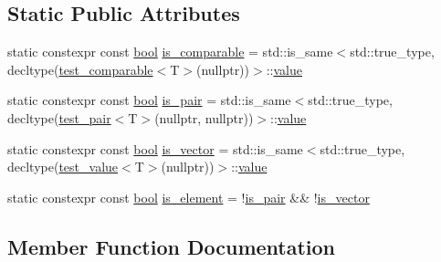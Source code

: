 \subsection*{Static Public Attributes}
\begin{DoxyCompactItemize}
\item 
static constexpr const \mbox{\hyperlink{asdl_8h_af6a258d8f3ee5206d682d799316314b1}{bool}} \mbox{\hyperlink{structcontainer__traits_ab2461388054411125b0719d7faf82978}{is\+\_\+comparable}} = std\+::is\+\_\+same$<$std\+::true\+\_\+type, decltype(\mbox{\hyperlink{structcontainer__traits_a0a60178e5fff65d3a89a1454776e1668}{test\+\_\+comparable}}$<$T$>$(nullptr))$>$\+::\mbox{\hyperlink{_s_d_l__opengl__glext_8h_a8ad81492d410ff2ac11f754f4042150f}{value}}
\item 
static constexpr const \mbox{\hyperlink{asdl_8h_af6a258d8f3ee5206d682d799316314b1}{bool}} \mbox{\hyperlink{structcontainer__traits_ae17fa45f5c1984602e162ba0d9ee7f72}{is\+\_\+pair}} = std\+::is\+\_\+same$<$std\+::true\+\_\+type, decltype(\mbox{\hyperlink{structcontainer__traits_a29ea1a081953a79394605cc9ca7a3694}{test\+\_\+pair}}$<$T$>$(nullptr, nullptr))$>$\+::\mbox{\hyperlink{_s_d_l__opengl__glext_8h_a8ad81492d410ff2ac11f754f4042150f}{value}}
\item 
static constexpr const \mbox{\hyperlink{asdl_8h_af6a258d8f3ee5206d682d799316314b1}{bool}} \mbox{\hyperlink{structcontainer__traits_a766d4e152eb677e230229880dee2dbb2}{is\+\_\+vector}} = std\+::is\+\_\+same$<$std\+::true\+\_\+type, decltype(\mbox{\hyperlink{structcontainer__traits_a00e1d17df72634112a0d82724df08e97}{test\+\_\+value}}$<$T$>$(nullptr))$>$\+::\mbox{\hyperlink{_s_d_l__opengl__glext_8h_a8ad81492d410ff2ac11f754f4042150f}{value}}
\item 
static constexpr const \mbox{\hyperlink{asdl_8h_af6a258d8f3ee5206d682d799316314b1}{bool}} \mbox{\hyperlink{structcontainer__traits_ae5c7a42dfa2b713aae741ed37d6c192b}{is\+\_\+element}} = !\mbox{\hyperlink{structcontainer__traits_ae17fa45f5c1984602e162ba0d9ee7f72}{is\+\_\+pair}} \&\& !\mbox{\hyperlink{structcontainer__traits_a766d4e152eb677e230229880dee2dbb2}{is\+\_\+vector}}
\end{DoxyCompactItemize}


\subsection{Member Function Documentation}
\mbox{\label{structcontainer__traits_a0a60178e5fff65d3a89a1454776e1668}} 
